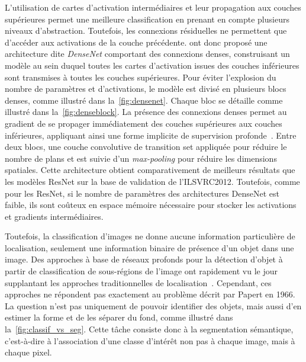 

L'utilisation de cartes d'activation intermédiaires et leur propagation aux couches supérieures permet une meilleure classification en prenant en compte plusieurs niveaux d'abstraction. Toutefois, les connexions résiduelles ne permettent que d'accéder aux activations de la couche précédente. \citet{huang_densely_2017} ont donc proposé une architecture dite \emph{DenseNet} comportant des connexions denses, construisant un modèle au sein duquel toutes les cartes d'activation issues des couches inférieures sont transmises à toutes les couches supérieures. Pour éviter l'explosion du nombre de paramètres et d'activations, le modèle est divisé en plusieurs blocs denses, comme illustré dans la~\cref{fig:densenet}. Chaque bloc se détaille comme illustré dans la~\cref{fig:denseblock}. La présence des connexions denses permet au gradient de se propager immédiatement des couches supérieures aux couches inférieures, appliquant ainsi une forme implicite de supervision profonde~\cite{lee_deeply-supervised_2015}. Entre deux blocs, une couche convolutive de transition set appliquée pour réduire le nombre de plans et est suivie d'un \emph{max-pooling} pour réduire les dimensions spatiales. Cette architecture obtient comparativement de meilleurs résultats que les modèles ResNet sur la base de validation de l'\gls{ILSVRC}2012. Toutefois, comme pour les ResNet, si le nombre de paramètres des architectures DenseNet est faible, ils sont coûteux en espace mémoire nécessaire pour stocker les activations et gradients intermédiaires.



Toutefois, la classification d'images ne donne aucune information particulière de localisation, seulement une information binaire de présence d'un objet dans une image. Des approches à base de réseaux profonds pour la détection d'objet à partir de classification de sous-régions de l'image ont rapidement vu le jour~\cite{girshick_rich_2014,liu_ssd_2016,girshick_region-based_2016} supplantant les approches traditionnelles de localisation~\cite{lowe_object_1999,dalal_histograms_2005,gu_recognition_2009,uijlings_selective_2013}. Cependant, ces approches ne répondent pas exactement au problème décrit par Papert en 1966. La question n'est pas uniquement de pouvoir identifier des objets, mais aussi d'en estimer la forme et de les séparer du fond, comme illustré dans la~\cref{fig:classif_vs_seg}. Cette tâche consiste donc à la segmentation sémantique, c'est-à-dire à l'association d'une classe d'intérêt non pas à chaque image, mais à chaque pixel.

